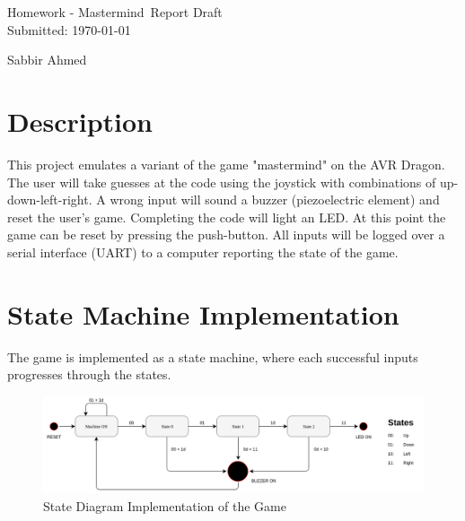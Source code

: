 \documentclass[usletter, 12pt]{article}
\newcommand{\project}{Homework - Mastermind}
\newcommand{\Sabbir}{Sabbir Ahmed}
\begin{document}

    \begin{titlepage}

        \vspace*{\fill} %
        \begin{center}

            {\LARGE \project~Report Draft}\\ [1.5cm]

            Submitted: \today
            
            \vspace*{\fill}

            \Sabbir

        \end{center}
        \vspace*{\fill} %

    \end{titlepage}

    \section{Description}

        This project emulates a variant of the game "mastermind" on the AVR Dragon. The user will take guesses at the code using the joystick with combinations of up-down-left-right. A wrong input will sound a buzzer (piezoelectric element) and reset the user’s game. Completing the code will light an LED. At this point the game can be reset by pressing the push-button. All inputs will be logged over a serial interface (UART) to a computer reporting the state of the game.

    \section{State Machine Implementation}

        The game is implemented as a state machine, where each successful inputs progresses through the states.

        \begin{figure}[ht]
            \begin{center}
                \includegraphics[width=1\textwidth]{state_diagram.png}
                \caption{State Diagram Implementation of the Game} \label{fig:state_diagram}
            \end{center}
        \end{figure}
\end{document}

